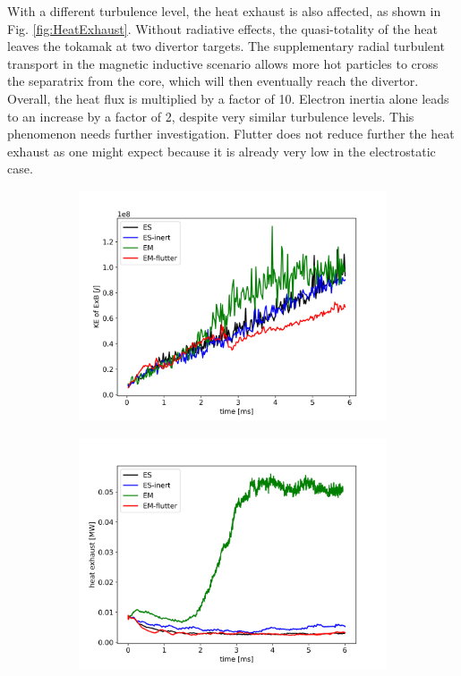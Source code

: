 With a different turbulence level, the heat exhaust is also affected, as shown in Fig. \ref{fig:HeatExhaust}. Without radiative effects, the quasi-totality of the heat leaves the tokamak at two divertor targets. The supplementary radial turbulent transport in the magnetic inductive scenario allows more hot particles to cross the separatrix from the core, which will then eventually reach the divertor. Overall, the heat flux is multiplied by a factor of 10. Electron inertia alone leads to an increase by a factor of 2, despite very similar turbulence levels. This phenomenon needs further investigation. Flutter does not reduce further the heat exhaust as one might expect because it is already very low in the electrostatic case. \newline

\begin{figure}[H]\centering
	\begin{subfigure}[t]{0.45\textwidth}
		\centering
		\includegraphics[width=1\textwidth]{schemes/KE_ExB.png}
		\label{fig:KE_ExB}
	\end{subfigure}
	\begin{subfigure}[t]{0.45\textwidth}
		\centering
		\includegraphics[width=1\textwidth]{schemes/heatExhaust.png}

\end{subfigure}
\end{figure}
